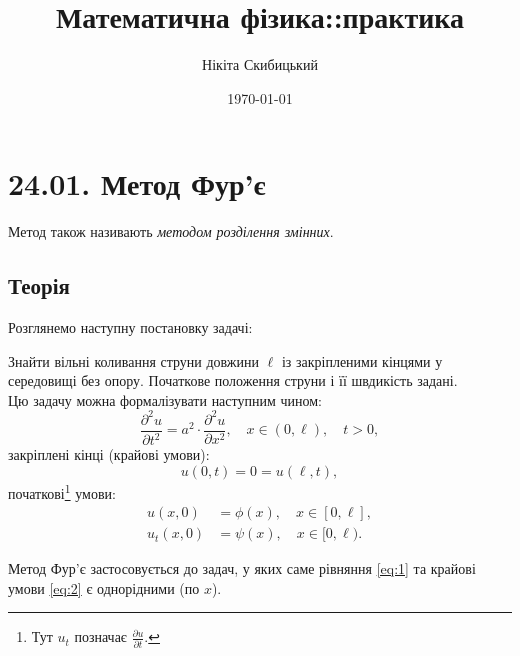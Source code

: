 


\title{Математична фізика::практика}
\author{Нікіта Скибицький}
\date{\today}



\maketitle

\tableofcontents

\section{24.01. Метод Фур'є}

Метод також називають \textit{методом розділення змінних}.

\subsection{Теорія}

Розглянемо наступну постановку задачі:

\begin{problem*}
	Знайти вільні коливання струни довжини $\ell$ із закріпленими кінцями у середовищі без опору. Початкове положення струни і її швдикість задані. \\

	Цю задачу можна формалізувати наступним чином:
	\begin{equation}
		\label{eq:1}
		\frac{\partial^2 u}{\partial t^2} = a^2 \cdot \frac{\partial^2 u}{\partial x^2}, \quad x \in (0, \ell), \quad t > 0,
	\end{equation}
	закріплені кінці (крайові умови):
	\begin{equation}
		\label{eq:2}
		u(0, t) = 0 = u(\ell, t),
	\end{equation}
	початкові\footnote{Тут $u_t$ позначає $\frac{\partial u}{\partial t}$.} умови:
	\begin{align}
		\label{eq:3}
		u(x, 0) &= \phi(x), \quad x \in [0, \ell], \\
		\label{eq:4}
		u_t(x, 0) &= \psi(x), \quad x \in [0, \ell).
	\end{align}
\end{problem*}

Метод Фур'є застосовується до задач, у яких саме рівняння \eqref{eq:1} та крайові умови \eqref{eq:2} є однорідними (по $x$).

